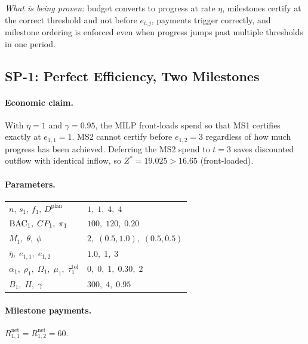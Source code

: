 \textit{What is being proven:} budget converts to progress at rate $\eta$,
milestones certify at the correct threshold and not before $e_{i,j}$,
payments trigger correctly, and milestone ordering is enforced even when
progress jumps past multiple thresholds in one period.

\subsection{SP-1: Perfect Efficiency, Two Milestones}

\paragraph{Economic claim.}
With $\eta=1$ and $\gamma=0.95$, the MILP front-loads spend so that
MS1 certifies exactly at $e_{1,1}=1$. MS2 cannot certify before
$e_{1,2}=3$ regardless of how much progress has been achieved.
Deferring the MS2 spend to $t=3$ saves discounted outflow with
identical inflow, so $Z^*=19.025>16.65$ (front-loaded).

\paragraph{Parameters.}
\begin{center}
\begin{tabular}{ll}
\toprule
$n,\,s_1,\,f_1,\,D^{\mathrm{plan}}$ & $1,\;1,\;4,\;4$\\
$\mathrm{BAC}_1,\;CP_1,\;\pi_1$ & $100,\;120,\;0.20$\\
$M_1,\;\theta,\;\phi$ & $2,\;(0.5,1.0),\;(0.5,0.5)$\\
$\bar\eta,\;e_{1,1},\;e_{1,2}$ & $1.0,\;1,\;3$\\
$\alpha_1,\;\rho_1,\;\Omega_1,\;\mu_1,\;\tau_1^{\mathrm{tol}}$ &
  $0,\;0,\;1,\;0.30,\;2$\\
$B_1,\;H,\;\gamma$ & $300,\;4,\;0.95$\\
\bottomrule
\end{tabular}
\end{center}

\paragraph{Milestone payments.}
$R_{1,1}^{\mathrm{net}}=R_{1,2}^{\mathrm{net}}=60$.

